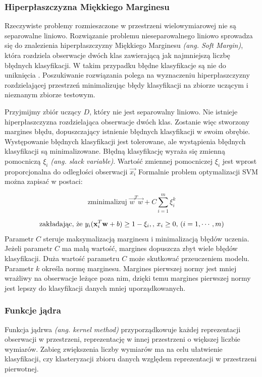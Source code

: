 \documentclass[a4paper,12pt,twoside,openany]{report}
\newcommand{\ang}[1]{\textit{(ang. #1)}}
\begin{document}
\subsubsection{Hiperpłaszczyzna Miękkiego Marginesu}
Rzeczywiste problemy rozmieszczone w przestrzeni wielowymiarowej nie są separowalne liniowo. 
Rozwiązanie problemu nieseparowalnego liniowo sprowadza się do znalezienia hiperpłaszczyzny Miękkiego Marginesu \ang{Soft Margin}, 
która rozdziela obserwacje dwóch klas zawierającą jak najmniejszą liczbę błędnych klasyfikacji.
W takim przypadku błędne klasyfikacje są nie do uniknięcia \cite{Dellepiane2015}.
Poszukiwanie rozwiązania polega na wyznaczeniu hiperpłaszczyzny rozdzielającej przestrzeń 
minimalizując błędy klasyfikacji na zbiorze uczącym i nieznanym zbiorze testowym.

Przyjmijmy zbiór uczący $D$, który nie jest separowalny liniowo. 
Nie istnieje hiperpłaszczyzna rozdzielająca obserwacje dwóch klas.
Zostanie więc stworzony margines błędu, dopuszczający istnienie błędnych klasyfikacji w swoim obrębie.
Występowanie błędnych klasyfikacji jest tolerowane, ale wystąpienia błędnych klasyfikacji są minimalizowane.
Błędną klasyfikację wyraża się zmienną pomocniczą $\xi_i$ \ang{slack variable}. 
Wartość zmiennej pomocniczej $\xi_i$ jest wprost proporcjonalna do odległości obserwacji $\vec{x_i}$
Formalnie problem optymalizacji SVM można zapisać w postaci:

\begin{equation}
\mbox{zminimalizuj } {\vec w}^T {\vec w}+C\sum_{i=1}^m \xi_i^k
\end{equation}

\begin{equation}
	\mbox{zakładając, że }  y_i ({\bf x}_i^T {\bf w}+b) \ge 1-\xi_i,
	\mbox{, }x_i \ge 0 \mbox{, }(i=1,\cdots,m)
\end{equation}
Parametr $C$ steruje maksymalizacją marginesu i minimalizacją błędów uczenia.
Jeżeli parametr $C$ ma małą wartość, margines dopuszcza zbyt wiele błędów klasyfikacji.
Duża wartość parametru $C$ może skutkować przeuczeniem modelu.
Parametr $k$ określa normę marginesu. 
Margines pierwszej normy jest mniej wrażliwy na obserwacje leżące poza nim,
dzięki temu margines pierwszej normy jest lepszy do klasyfikacji danych mniej uporządkowanych.

\subsubsection{Funkcje jądra}
Funkcja jądrwa \ang{kernel method} 
przyporządkowuje każdej reprezentacji obserwacji w przestrzeni,
reprezentację w innej przestrzeni o większej liczbie wymiarów.
Zabieg zwiększenia liczby wymiarów ma na celu ułatwienie 
klasyfikacji, czy klasteryzacji zbioru danych względem
reprezentacji w przestrzeni pierwotnej. 
\end{document}

